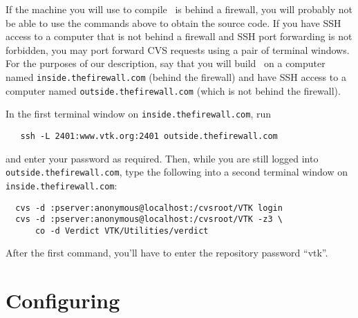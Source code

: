 If the machine you will use to compile \verd\ is behind a firewall,
you will probably not be able to use the commands above to obtain the source code.
If you have SSH access to a computer that is not behind a firewall and
SSH port forwarding is not forbidden, you may port forward CVS requests using a pair of
terminal windows.
For the purposes of our description,
say that you will build \verd\ on a computer named \texttt{inside.thefirewall.com} (behind the firewall) and
have SSH access to a computer named \texttt{outside.thefirewall.com} (which is not behind the firewall).

In the first terminal window on \texttt{inside.thefirewall.com}, run
\begin{verbatim}
   ssh -L 2401:www.vtk.org:2401 outside.thefirewall.com
\end{verbatim}
and enter your password as required.
Then, while you are still logged into \texttt{outside.}\-\texttt{thefirewall.com},
type the following into a second terminal window on \texttt{inside.}\-\texttt{thefirewall.com}:
\begin{verbatim}
  cvs -d :pserver:anonymous@localhost:/cvsroot/VTK login
  cvs -d :pserver:anonymous@localhost:/cvsroot/VTK -z3 \
      co -d Verdict VTK/Utilities/verdict
\end{verbatim}
After the first command, you'll have to enter the repository password ``vtk''.

\section{Configuring \verd}

